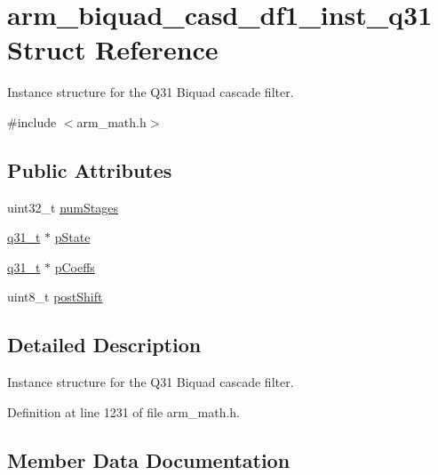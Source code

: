 \hypertarget{structarm__biquad__casd__df1__inst__q31}{}\section{arm\+\_\+biquad\+\_\+casd\+\_\+df1\+\_\+inst\+\_\+q31 Struct Reference}
\label{structarm__biquad__casd__df1__inst__q31}


Instance structure for the Q31 Biquad cascade filter.  




{\ttfamily \#include $<$arm\+\_\+math.\+h$>$}

\subsection*{Public Attributes}
\begin{DoxyCompactItemize}
\item 
uint32\+\_\+t \hyperlink{structarm__biquad__casd__df1__inst__q31_a2c2b579f1df1d8273a5d9d945c27e1b2}{num\+Stages}
\item 
\hyperlink{arm__math_8h_adc89a3547f5324b7b3b95adec3806bc0}{q31\+\_\+t} $\ast$ \hyperlink{structarm__biquad__casd__df1__inst__q31_a5dcf4727f58eb4e8e8b392508d8657bb}{p\+State}
\item 
\hyperlink{arm__math_8h_adc89a3547f5324b7b3b95adec3806bc0}{q31\+\_\+t} $\ast$ \hyperlink{structarm__biquad__casd__df1__inst__q31_aa62366c632f3b5305086f841f079dbd2}{p\+Coeffs}
\item 
uint8\+\_\+t \hyperlink{structarm__biquad__casd__df1__inst__q31_a636c7fbe09ec4bef0bc0a4b4e2151cbe}{post\+Shift}
\end{DoxyCompactItemize}


\subsection{Detailed Description}
Instance structure for the Q31 Biquad cascade filter. 

Definition at line 1231 of file arm\+\_\+math.\+h.



\subsection{Member Data Documentation}
\mbox{\label{structarm__biquad__casd__df1__inst__q31_a2c2b579f1df1d8273a5d9d945c27e1b2}} 
